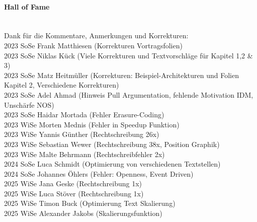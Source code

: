 \documentclass[a4paper,10pt]{book}
\begin{document}
\paragraph{Hall of Fame}
\mbox{}\\
Dank für die Kommentare, Anmerkungen und Korrekturen:  \\
2023 SoSe Frank Matthiesen (Korrekturen Vortragsfolien) \\
2023 SoSe Niklas Kück (Viele Korrekturen und Textvorschläge für Kapitel 1,2 \& 3)\\
2023 SoSe Matz Heitmüller (Korrekturen: Beispiel-Architekturen und Folien Kapitel 2, Verschiedene Korrekturen) \\
2023 SoSe Adel Ahmad (Hinweis Pull Argumentation, fehlende Motivation IDM, Unschärfe NOS) \\
2023 SoSe Haidar Mortada (Fehler  Erasure-Coding) \\
2023 WiSe Morten Mednis (Fehler in Speedup Funktion) \\
2023 WiSe Yannis Günther (Rechtschreibung 26x) \\
2023 WiSe Sebastian Wewer (Rechtschreibung 38x, Position Graphik) \\
2023 WiSe Malte Behrmann (Rechtschreibfehler 2x)\\
2024 SoSe Luca Schmidt (Optimierung von verschiedenen Textstellen) \\
2024 SoSe Johannes Öhlers (Fehler: Openness, Event Driven)\\
2025 WiSe Jana Geske (Rechtschreibung 1x)\\
2025 WiSe Luca Stöver (Rechtschreibung 1x)\\
2025 WiSe Timon Buck (Optimierung Text Skalierung)\\
2025 WiSe Alexander Jakobs (Skalierungsfunktion)\\
\\
\tableofcontents
\newpage

\newpage

\newpage

\newpage


\newpage
\end{document}

